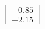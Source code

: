 \documentclass[preview]{standalone}
\begin{document}
\begin{align*}
\begin{bmatrix} -0.85 \\ -2.15 \end{bmatrix}
\end{align*}
\end{document}
